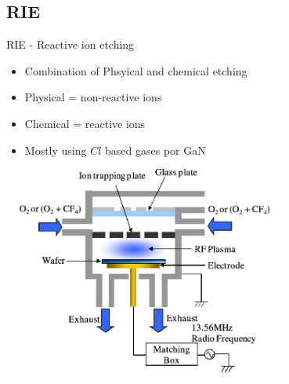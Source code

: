 \documentclass{beamer}
\begin{document}
\subsection{RIE}
\begin{frame}{RIE - Reactive ion etching}

    \begin{itemize}
    \item
	Combination of Phsyical and chemical etching
      \pause
    \item
 	Physical = non-reactive ions
      \pause
    \item
 	Chemical = reactive ions
\pause
    \item
 	Mostly using $Cl$ based gases por GaN
\end{itemize}

\begin{center}
\includegraphics[width=0.7\textwidth]{rie.png}
\end{center}

\end{frame}
\end{document}
